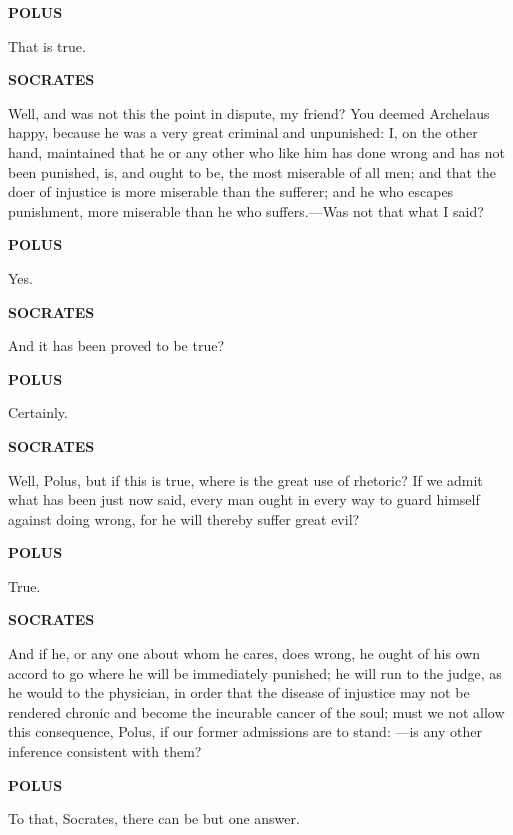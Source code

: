 \documentclass[11pt,letter]{article}
\begin{document}
\par \textbf{POLUS}
\par   That is true.

\par \textbf{SOCRATES}
\par   Well, and was not this the point in dispute, my friend? You deemed Archelaus happy, because he was a very great criminal and unpunished:  I, on the other hand, maintained that he or any other who like him has done wrong and has not been punished, is, and ought to be, the most miserable of all men; and that the doer of injustice is more miserable than the sufferer; and he who escapes punishment, more miserable than he who suffers.—Was not that what I said?

\par \textbf{POLUS}
\par   Yes.

\par \textbf{SOCRATES}
\par   And it has been proved to be true?

\par \textbf{POLUS}
\par   Certainly.

\par \textbf{SOCRATES}
\par   Well, Polus, but if this is true, where is the great use of rhetoric? If we admit what has been just now said, every man ought in every way to guard himself against doing wrong, for he will thereby suffer great evil?

\par \textbf{POLUS}
\par   True.

\par \textbf{SOCRATES}
\par   And if he, or any one about whom he cares, does wrong, he ought of his own accord to go where he will be immediately punished; he will run to the judge, as he would to the physician, in order that the disease of injustice may not be rendered chronic and become the incurable cancer of the soul; must we not allow this consequence, Polus, if our former admissions are to stand: —is any other inference consistent with them?

\par \textbf{POLUS}
\par   To that, Socrates, there can be but one answer.
\end{document}
